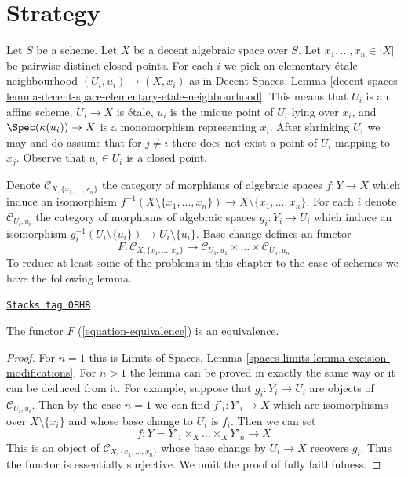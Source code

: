 \section{Strategy}
\label{spaces-resolve-section-strategy}
Let $S$ be a scheme. Let $X$ be a decent algebraic space over $S$.
Let $x_1, \ldots, x_n \in |X|$ be pairwise distinct closed points.
For each $i$ we pick an elementary \'etale neighbourhood
$(U_i, u_i) \to (X, x_i)$ as in Decent Spaces, Lemma
\ref{decent-spaces-lemma-decent-space-elementary-etale-neighbourhood}.
This means that $U_i$ is an affine scheme, $U_i \to X$ is \'etale,
$u_i$ is the unique point of $U_i$ lying over $x_i$, and
$\Spec(\kappa(u_i)) \to X$ is a monomorphism representing $x_i$.
After shrinking $U_i$ we may and do assume that for $j \not = i$
there does not exist a point of $U_i$ mapping to $x_j$.
Observe that $u_i \in U_i$ is a closed point.

\medskip\noindent
Denote $\mathcal{C}_{X, \{x_1, \ldots, x_n\}}$ the category of
morphisms of algebraic spaces $f : Y \to X$ which induce an isomorphism
$f^{-1}(X \setminus \{x_1, \ldots, x_n\}) \to X \setminus \{x_1, \ldots, x_n\}$.
For each $i$ denote $\mathcal{C}_{U_i, u_i}$ the category of
morphisms of algebraic spaces $g_i : Y_i \to U_i$ which induce an
isomorphism $g_i^{-1}(U_i \setminus \{u_i\}) \to U_i \setminus \{u_i\}$.
Base change defines an functor
\begin{equation}
\label{equation-equivalence}
F :
\mathcal{C}_{X, \{x_1, \ldots, x_n\}}
\longrightarrow
\mathcal{C}_{U_1, u_1} \times \ldots \times \mathcal{C}_{U_n, u_n}
\end{equation}
To reduce at least some of the problems in this chapter to the case
of schemes we have the following lemma.

\begin{lemma}[Equivalence]
\label{spaces-resolve-lemma-equivalence}
\href{https://stacks.math.columbia.edu/tag/0BHB}{\texttt{Stacks tag 0BHB}}

The functor $F$ (\ref{equation-equivalence}) is an equivalence.
\end{lemma}

\begin{proof}
For $n = 1$ this is Limits of Spaces, Lemma
\ref{spaces-limits-lemma-excision-modifications}.
For $n > 1$ the lemma can be proved in exactly the same way or it
can be deduced from it. For example, suppose that
$g_i : Y_i \to U_i$ are objects of $\mathcal{C}_{U_i, u_i}$.
Then by the case $n = 1$ we can find $f'_i : Y'_i \to X$
which are isomorphisms over $X \setminus \{x_i\}$ and whose
base change to $U_i$ is $f_i$. Then we can set
$$
f : Y = Y'_1 \times_X \ldots \times_X Y'_n \to X
$$
This is an object of $\mathcal{C}_{X, \{x_1, \ldots, x_n\}}$
whose base change by $U_i \to X$ recovers $g_i$. Thus the functor
is essentially surjective. We omit the proof of
fully faithfulness.
\end{proof}

